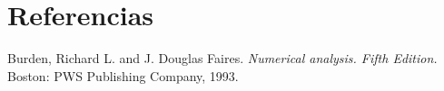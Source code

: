 \documentclass[11pt, a4paper]{article}
\begin{document}


\tableofcontents
\newpage






\section{Referencias}

\begin{thebibliography}{999}

      Burden, Richard L. and J. Douglas Faires.
      \emph{Numerical analysis. Fifth Edition.}
      Boston: PWS Publishing Company,
      1993.
      
\end{thebibliography}
\end{document}
